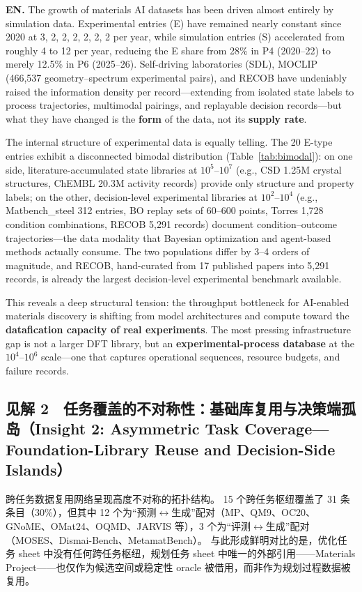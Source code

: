 \documentclass[11pt,a4paper]{ctexart}
\begin{document}
\textbf{EN.} The growth of materials AI datasets has been driven almost entirely by simulation data. Experimental entries (E) have remained nearly constant since 2020 at 3, 2, 2, 2, 2, 2, 2 per year, while simulation entries (S) accelerated from roughly 4 to 12 per year, reducing the E share from 28\% in P4 (2020--22) to merely 12.5\% in P6 (2025--26). Self-driving laboratories (SDL), MOCLIP (466,537 geometry--spectrum experimental pairs), and RECOB have undeniably raised the information density per record---extending from isolated state labels to process trajectories, multimodal pairings, and replayable decision records---but what they have changed is the \textbf{form} of the data, not its \textbf{supply rate}.

The internal structure of experimental data is equally telling. The 20 E-type entries exhibit a disconnected bimodal distribution (Table~\ref{tab:bimodal}): on one side, literature-accumulated state libraries at $10^5$--$10^7$ (e.g., CSD 1.25M crystal structures, ChEMBL 20.3M activity records) provide only structure and property labels; on the other, decision-level experimental libraries at $10^2$--$10^4$ (e.g., Matbench\_steel 312 entries, BO replay sets of 60--600 points, Torres 1,728 condition combinations, RECOB 5,291 records) document condition--outcome trajectories---the data modality that Bayesian optimization and agent-based methods actually consume. The two populations differ by 3--4 orders of magnitude, and RECOB, hand-curated from 17 published papers into 5,291 records, is already the largest decision-level experimental benchmark available.

This reveals a deep structural tension: the throughput bottleneck for AI-enabled materials discovery is shifting from model architectures and compute toward the \textbf{datafication capacity of real experiments}. The most pressing infrastructure gap is not a larger DFT library, but an \textbf{experimental-process database} at the $10^4$--$10^6$ scale---one that captures operational sequences, resource budgets, and failure records.

\subsection*{见解 2　任务覆盖的不对称性：基础库复用与决策端孤岛（Insight 2: Asymmetric Task Coverage---Foundation-Library Reuse and Decision-Side Islands）}

跨任务数据复用网络呈现高度不对称的拓扑结构。
15 个跨任务枢纽覆盖了 31 条条目（30\%），但其中 12 个为``预测$\leftrightarrow$生成''配对（MP、QM9、OC20、GNoME、OMat24、OQMD、JARVIS 等），3 个为``评测$\leftrightarrow$生成''配对（MOSES、Dismai-Bench、MetamatBench）。
与此形成鲜明对比的是，优化任务 sheet 中没有任何跨任务枢纽，规划任务 sheet 中唯一的外部引用——Materials Project——也仅作为候选空间或稳定性 oracle 被借用，而非作为规划过程数据被复用。
\end{document}
